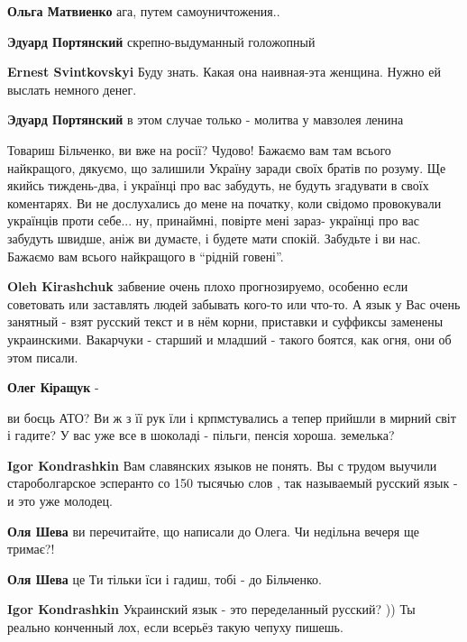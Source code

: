 \begin{itemize}
\begin{itemize}
\textbf{Ольга Матвиенко} ага, путем самоуничтожения..

\textbf{Эдуард Портянский} скрепно-выдуманный голожопный

\textbf{Ernest Svintkovskyi} Буду знать. Какая она наивная-эта женщина. Нужно ей выслать немного денег.

\textbf{Эдуард Портянский} в этом случае только - молитва у мавзолея ленина
\end{itemize} %


Товариш Більченко, ви вже на росії? Чудово! Бажаємо вам там всього найкращого,
дякуємо, що залишили Україну заради своїх братів по розуму. Ще якийсь
тиждень-два, і українці про вас забудуть, не будуть згадувати в своїх
коментарях. Ви не дослухались до мене на початку, коли свідомо провокували
українців проти себе... ну, принаймні, повірте мені зараз- українці про вас
забудуть швидше, аніж ви думаєте, і будете мати спокій. Забудьте і ви нас.
Бажаємо вам всього найкращого в \enquote{рідній говені}.

\begin{itemize} %
\textbf{Oleh Kirashchuk} забвение очень плохо прогнозируемо, особенно если советовать или заставлять людей забывать кого-то или что-то. А язык у Вас очень занятный - взят русский текст и в нём корни, приставки и суффиксы заменены украинскими. Вакарчуки - старший и младший - такого боятся, как огня, они об этом писали.

\textbf{Олег Кіращук} - 

ви боєць АТО? Ви ж з її рук їли і крпмстувались а тепер прийшли в мирний світ і
гадите? У вас уже все в шоколаді - пільги, пенсія хороша. земелька?


\textbf{Igor Kondrashkin} Вам славянских языков не понять. Вы с трудом выучили староболгарское эсперанто со 150 тысячью слов , так называемый русский язык - и это уже молодец.

\textbf{Оля Шева} ви перечитайте, що написали до Олега. Чи недільна вечеря ще тримає?!

\textbf{Оля Шева} це Ти тільки їси і гадиш, тобі - до Більченко.

\textbf{Igor Kondrashkin} Украинский язык - это переделанный русский? )) Ты реально конченный лох, если всерьёз такую чепуху пишешь.


\end{itemize}
\end{itemize}
